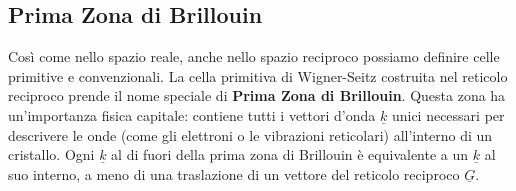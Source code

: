 \subsection{Prima Zona di Brillouin}

Così come nello spazio reale, anche nello spazio reciproco possiamo definire celle primitive e convenzionali. La cella primitiva di Wigner-Seitz costruita nel reticolo reciproco prende il nome speciale di \textbf{Prima Zona di Brillouin}.
Questa zona ha un'importanza fisica capitale: contiene tutti i vettori d'onda $\underline{k}$ unici necessari per descrivere le onde (come gli elettroni o le vibrazioni reticolari) all'interno di un cristallo. Ogni $\underline{k}$ al di fuori della prima zona di Brillouin è equivalente a un $\underline{k}$ al suo interno, a meno di una traslazione di un vettore del reticolo reciproco $\underline{G}$.